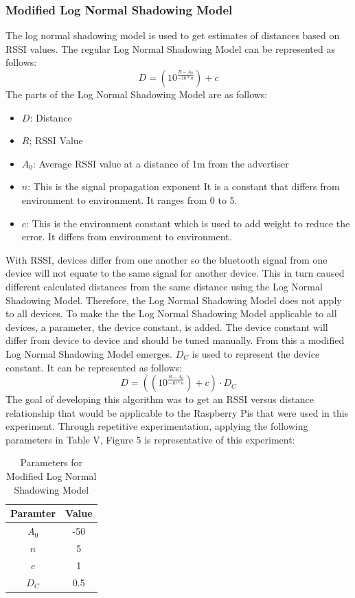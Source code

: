 \documentclass[letterpaper, 10 pt, conference]{ieeeconf}  %
\begin{document}
\subsubsection{Modified  Log  Normal  Shadowing  Model}
The log normal shadowing model is used to get estimates of distances based on RSSI values. The regular Log Normal Shadowing Model can be represented as follows:
\begin{equation}
    D = (10^\frac {R - A_0}{-10*n}) + c
\end{equation}
The parts of the Log Normal Shadowing Model are as follows:
\begin{itemize}
\item $D$: Distance 
\item $R$; RSSI Value
\item $A_0$: Average RSSI value at a distance of 1m from the advertiser
\item $n$: This is the signal propagation exponent It is a constant that differs from environment to environment. It ranges from 0 to 5.
\item $c$: This is the environment constant which is used to add weight to reduce the error. It differs from environment to environment.
\end{itemize}
\smallbreak
With RSSI, devices differ from one another so the bluetooth signal from one device will not equate to the same signal for another device. This in turn caused different calculated distances from the same distance using the Log Normal Shadowing Model. Therefore, the Log Normal Shadowing Model does not apply to all devices. 
\smallbreak
To make the the Log Normal Shadowing Model applicable to all devices, a parameter, the device constant, is added. The device constant will differ from device to device and should be tuned manually. From this a modified Log Normal Shadowing Model emerges. $D_C$ is used to represent the device constant. It can be represented as follows:
\begin{equation}
    D = ((10^\frac {R - A_0}{-10*n}) + c) \cdot D_C
\end{equation}
The goal of developing this algorithm was to get an RSSI versus distance relationship that would be applicable to the Raspberry Pis that were used in this experiment. Through repetitive experimentation, applying the following parameters in Table V, Figure 5 is representative of this experiment:
\begin{table}[h]
\caption{Parameters for Modified Log Normal Shadowing Model}
\label{table_example}
\begin{center}
\begin{tabular}{|c|c|}
\hline
\bf Paramter & \bf Value \\
\hline
$A_0$ & -50\\
\hline
$n$ & 5\\
\hline
$c$ & 1\\
\hline
$D_C$ & 0.5\\
\hline
\end{tabular}
\end{center}
\end{table}
\end{document}
